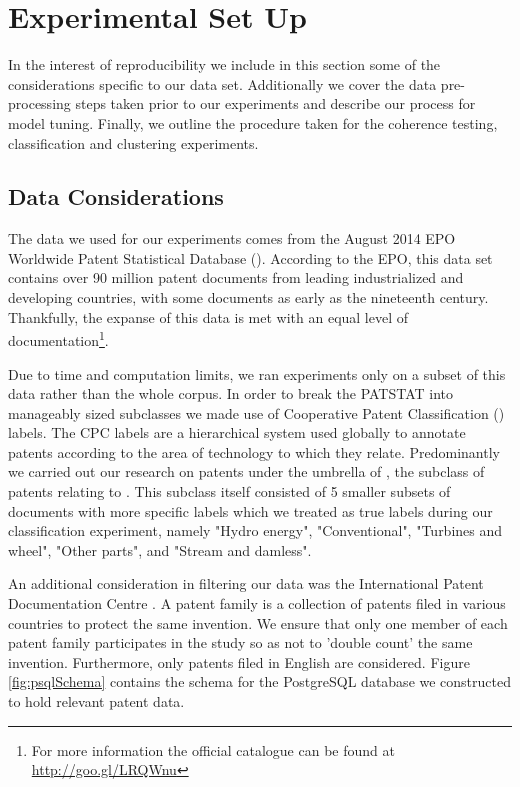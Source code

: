 
\chapter{Experimental Set Up} %

\label{Chapter3} %
In the interest of reproducibility we include in this section some of the considerations specific to our data set. Additionally we cover the data pre-processing steps taken prior to our experiments and describe our process for model tuning. Finally, we outline the procedure taken for the coherence testing, classification and clustering experiments. 

\section{Data Considerations}

The data we used for our experiments comes from the August 2014 EPO Worldwide Patent Statistical Database (). According to the EPO, this data set contains over 90 million patent documents from leading industrialized and developing countries, with some documents as early as the nineteenth century. Thankfully, the expanse of this data is met with an equal level of documentation\footnote{For more information the official catalogue can be found at \url{http://goo.gl/LRQWnu}}. 


Due to time and computation limits, we ran experiments only on a subset of this data rather than the whole corpus. In order to break the PATSTAT into manageably sized subclasses we made use of Cooperative Patent Classification () labels. The CPC labels are a hierarchical system used globally to annotate patents according to the area of technology to which they relate. Predominantly we carried out our research on patents under the umbrella of , the subclass of patents relating to . This subclass itself consisted of 5 smaller subsets of documents with more specific labels which we treated as true labels during our classification experiment, namely "Hydro energy", "Conventional", "Turbines and wheel", "Other parts", and "Stream and damless".

An additional consideration in filtering our data was the International Patent Documentation Centre . A patent family is a collection of patents filed in various countries to protect the same invention. We ensure that only one member of each patent family participates in the study so as not to 'double count' the same invention. Furthermore, only patents filed in English are considered. Figure \ref{fig:psqlSchema} contains the schema for the PostgreSQL database we constructed to hold relevant patent data.


